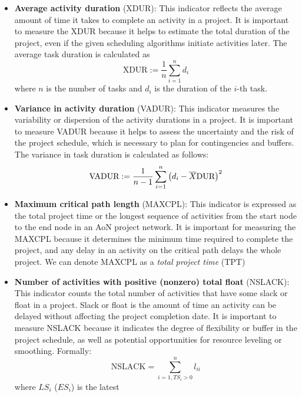 \documentclass[preprint,
3p]{elsarticle} %
\begin{document}
\begin{appendices}
\begin{itemize}
\item
  \textbf{Average activity duration} (XDUR): This indicator reflects the
  average amount of time it takes to complete an activity in a project.
  It is important to measure the XDUR because it helps to estimate the
  total duration of the project, even if the given scheduling algorithms
  initiate activities later. The average task duration is calculated as
  \begin{equation}
  \label{eq:XDUR}
  \text{XDUR}:=\frac{1}{n}\sum_{i=1}^n d_{i}
  \end{equation} \noindent where \(n\) is the number of tasks and
  \(d_i\) is the duration of the \(i\)-th task.
\item
  \textbf{Variance in activity duration} (VADUR): This indicator
  measures the variability or dispersion of the activity durations in a
  project. It is important to measure VADUR because it helps to assess
  the uncertainty and the risk of the project schedule, which is
  necessary to plan for contingencies and buffers. The variance in task
  duration is calculated as follows: \begin{equation} 
  \label{eq:VADUR} 
  \text{VADUR}:=\frac{1}{n-1}
  \sum_{i=1}^{n}\left( d_{i}-\overline{X}\textnormal{DUR}\right) ^{2}
  \end{equation}
\item
  \textbf{Maximum critical path length} (MAXCPL): This indicator is
  expressed as the total project time or the longest sequence of
  activities from the start node to the end node in an AoN project
  network. It is important for measuring the MAXCPL because it
  determines the minimum time required to complete the project, and any
  delay in an activity on the critical path delays the whole project. We
  can denote MAXCPL as a \emph{total project time} (TPT)
\item
  \textbf{Number of activities with positive (nonzero) total float}
  (NSLACK): This indicator counts the total number of activities that
  have some slack or float in a project. Slack or float is the amount of
  time an activity can be delayed without affecting the project
  completion date. It is important to measure NSLACK because it
  indicates the degree of flexibility or buffer in the project schedule,
  as well as potential opportunities for resource leveling or smoothing.
  Formally: \begin{equation}
  \label{eq:NSLACK}
  \text{NSLACK}=\sum_{i=1,TS_i>0}^n l_{ii}
  \end{equation} \noindent where \(LS_i\) (\(ES_i\)) is the latest

\end{itemize}
\end{appendices}
\end{document}
